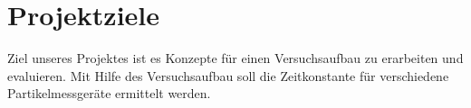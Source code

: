 \section{Projektziele}
Ziel unseres Projektes ist es Konzepte f\"{u}r einen Versuchsaufbau zu erarbeiten und evaluieren. Mit Hilfe des Versuchsaufbau soll die Zeitkonstante f\"{u}r verschiedene Partikelmessger\"{a}te ermittelt werden.